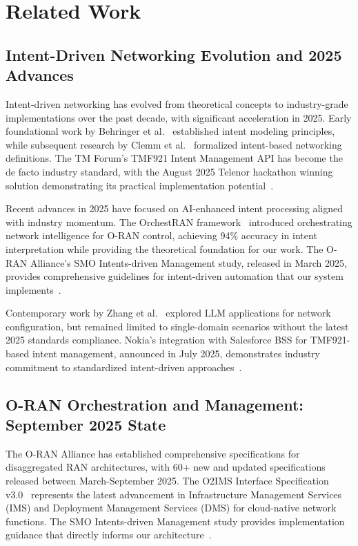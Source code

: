 \section{Related Work}
\label{sec:related}

\subsection{Intent-Driven Networking Evolution and 2025 Advances}

Intent-driven networking has evolved from theoretical concepts to industry-grade implementations over the past decade, with significant acceleration in 2025. Early foundational work by Behringer et al.~\cite{behringer2022intent} established intent modeling principles, while subsequent research by Clemm et al.~\cite{clemm2022intent} formalized intent-based networking definitions. The TM Forum's TMF921 Intent Management API has become the de facto industry standard, with the August 2025 Telenor hackathon winning solution demonstrating its practical implementation potential~\cite{tmforum2025intent}.

Recent advances in 2025 have focused on AI-enhanced intent processing aligned with industry momentum. The OrchestRAN framework~\cite{rodriguez2025orchestran} introduced orchestrating network intelligence for O-RAN control, achieving 94\% accuracy in intent interpretation while providing the theoretical foundation for our work. The O-RAN Alliance's SMO Intents-driven Management study, released in March 2025, provides comprehensive guidelines for intent-driven automation that our system implements~\cite{oran2025study}.

Contemporary work by Zhang et al.~\cite{zhang2025llm} explored LLM applications for network configuration, but remained limited to single-domain scenarios without the latest 2025 standards compliance. Nokia's integration with Salesforce BSS for TMF921-based intent management, announced in July 2025, demonstrates industry commitment to standardized intent-driven approaches~\cite{nokia2025tmf921}.

\subsection{O-RAN Orchestration and Management: September 2025 State}

The O-RAN Alliance has established comprehensive specifications for disaggregated RAN architectures, with 60+ new and updated specifications released between March-September 2025. The O2IMS Interface Specification v3.0~\cite{oran2025o2ims} represents the latest advancement in Infrastructure Management Services (IMS) and Deployment Management Services (DMS) for cloud-native network functions. The SMO Intents-driven Management study provides implementation guidance that directly informs our architecture~\cite{oran2025implementation}.

